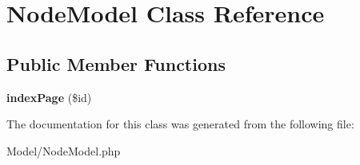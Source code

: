 \hypertarget{class_node_model}{\section{Node\-Model Class Reference}
\label{class_node_model}
}
\subsection*{Public Member Functions}
\begin{DoxyCompactItemize}
\item 
\hypertarget{class_node_model_a99d3df1e9eea9f8bbe8be04067299e1c}{{\bfseries index\-Page} (\$id)}\label{class_node_model_a99d3df1e9eea9f8bbe8be04067299e1c}

\end{DoxyCompactItemize}


The documentation for this class was generated from the following file\-:\begin{DoxyCompactItemize}
\item 
Model/Node\-Model.\-php\end{DoxyCompactItemize}

